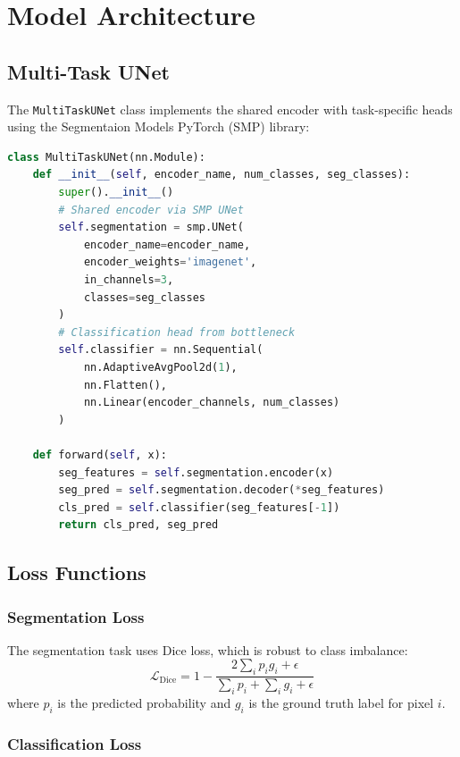 \documentclass[11pt,a4paper,twoside]{report}
\newcommand{\model}[1]{\texttt{#1}}
\begin{document}
\section{Model Architecture}

\subsection{Multi-Task UNet}

The \model{MultiTaskUNet} class implements the shared encoder with task-specific heads using the Segmentaion Models PyTorch (SMP) library:

\begin{lstlisting}[language=Python, caption=Multi-Task UNet definition]
class MultiTaskUNet(nn.Module):
    def __init__(self, encoder_name, num_classes, seg_classes):
        super().__init__()
        # Shared encoder via SMP UNet
        self.segmentation = smp.UNet(
            encoder_name=encoder_name,
            encoder_weights='imagenet',
            in_channels=3,
            classes=seg_classes
        )
        # Classification head from bottleneck
        self.classifier = nn.Sequential(
            nn.AdaptiveAvgPool2d(1),
            nn.Flatten(),
            nn.Linear(encoder_channels, num_classes)
        )
    
    def forward(self, x):
        seg_features = self.segmentation.encoder(x)
        seg_pred = self.segmentation.decoder(*seg_features)
        cls_pred = self.classifier(seg_features[-1])
        return cls_pred, seg_pred
\end{lstlisting}

\subsection{Loss Functions}

\subsubsection{Segmentation Loss}

The segmentation task uses Dice loss, which is robust to class imbalance:
\begin{equation}
\mathcal{L}_{\text{Dice}} = 1 - \frac{2 \sum_{i} p_i g_i + \epsilon}{\sum_{i} p_i + \sum_{i} g_i + \epsilon}
\end{equation}
where $p_i$ is the predicted probability and $g_i$ is the ground truth label for pixel $i$.

\subsubsection{Classification Loss}
\end{document}
